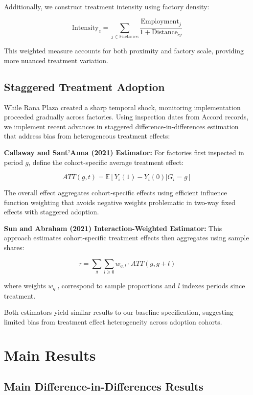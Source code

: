 \documentclass[12pt]{article}
\newcommand{\E}{\mathbb{E}}
\begin{document}
Additionally, we construct treatment intensity using factory density:

$$\text{Intensity}_c = \sum_{j \in \text{Factories}} \frac{\text{Employment}_j}{1 + \text{Distance}_{cj}}$$

This weighted measure accounts for both proximity and factory scale, providing more nuanced treatment variation.

\subsection{Staggered Treatment Adoption}

While Rana Plaza created a sharp temporal shock, monitoring implementation proceeded gradually across factories. Using inspection dates from Accord records, we implement recent advances in staggered difference-in-differences estimation that address bias from heterogeneous treatment effects:

\textbf{Callaway and Sant'Anna (2021) Estimator:} For factories first inspected in period $g$, define the cohort-specific average treatment effect:

$$ATT(g,t) = \E[Y_i(1) - Y_i(0) | G_i = g]$$

The overall effect aggregates cohort-specific effects using efficient influence function weighting that avoids negative weights problematic in two-way fixed effects with staggered adoption.

\textbf{Sun and Abraham (2021) Interaction-Weighted Estimator:} This approach estimates cohort-specific treatment effects then aggregates using sample shares:

$$\tau = \sum_g \sum_{l \geq 0} w_{g,l} \cdot ATT(g, g+l)$$

where weights $w_{g,l}$ correspond to sample proportions and $l$ indexes periods since treatment.

Both estimators yield similar results to our baseline specification, suggesting limited bias from treatment effect heterogeneity across adoption cohorts.


\section{Main Results}


\subsection{Main Difference-in-Differences Results}
\end{document}

